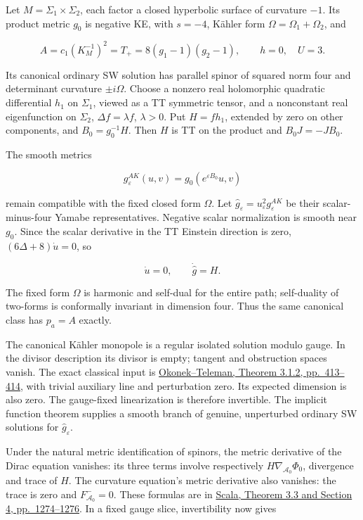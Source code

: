 \documentclass[
  10pt,
]{article}
\begin{document}
Let \(M=\Sigma_1\times\Sigma_2\), each factor a closed hyperbolic
surface of curvature \(-1\). Its product metric \(g_0\) is negative KE,
with \(s=-4\), Kähler form \(\Omega=\Omega_1+\Omega_2\), and

\[
 A=c_1(K_M^{-1})^2=T_+=8(g_1-1)(g_2-1),\qquad h=0,\quad U=3.
\]

Its canonical ordinary SW solution has parallel spinor of squared norm
four and determinant curvature \(\pm i\Omega\). Choose a nonzero real
holomorphic quadratic differential \(h_1\) on \(\Sigma_1\), viewed as a
TT symmetric tensor, and a nonconstant real eigenfunction on
\(\Sigma_2\), \(\Delta f=\lambda f\), \(\lambda>0\). Put \(H=f h_1\),
extended by zero on other components, and \(B_0=g_0^{-1}H\). Then \(H\)
is TT on the product and \(B_0J=-JB_0\).

The smooth metrics

\[
 g_\varepsilon^{AK}(u,v)=g_0(e^{\varepsilon B_0}u,v)
\]

remain compatible with the fixed closed form \(\Omega\). Let
\(\widehat g_\varepsilon=u_\varepsilon^2g_\varepsilon^{AK}\) be their
scalar-minus-four Yamabe representatives. Negative scalar normalization
is smooth near \(g_0\). Since the scalar derivative in the TT Einstein
direction is zero, \((6\Delta+8)\dot u=0\), so

\[
 \dot u=0,\qquad \dot{\widehat g}=H.                \tag{3.2}
\]

The fixed form \(\Omega\) is harmonic and self-dual for the entire path;
self-duality of two-forms is conformally invariant in dimension four.
Thus the same canonical class has \(p_a=A\) exactly.

The canonical Kähler monopole is a regular isolated solution modulo
gauge. In the divisor description its divisor is empty; tangent and
obstruction spaces vanish. The exact classical input is
\href{https://library.slmath.org/books/Book37/files/okonek.pdf}{Okonek--Teleman,
Theorem 3.1.2, pp.~413--414}, with trivial auxiliary line and
perturbation zero. Its expected dimension is also zero. The gauge-fixed
linearization is therefore invertible. The implicit function theorem
supplies a smooth branch of genuine, unperturbed ordinary SW solutions
for \(\widehat g_\varepsilon\).

Under the natural metric identification of spinors, the metric
derivative of the Dirac equation vanishes: its three terms involve
respectively \(H\nabla_{\mathcal A_0}\Phi_0\), divergence and trace of
\(H\). The curvature equation's metric derivative also vanishes: the
trace is zero and \(F_{\mathcal A_0}^-=0\). These formulas are in
\href{https://www.numdam.org/item/10.5802/aif.2640.pdf}{Scala, Theorem
3.3 and Section 4, pp.~1274--1276}. In a fixed gauge slice,
invertibility now gives
\end{document}
